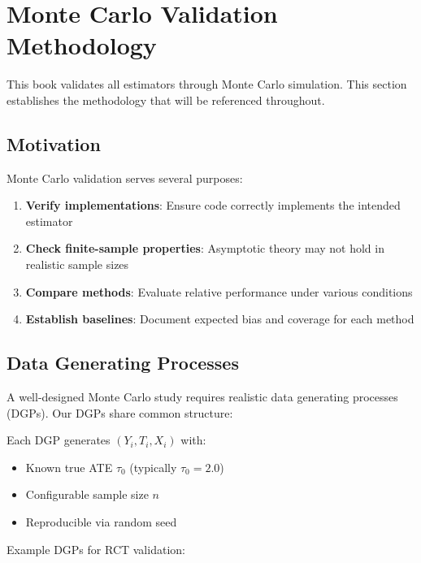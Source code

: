 \section{Monte Carlo Validation Methodology}
\label{sec:mc_methodology}

This book validates all estimators through Monte Carlo simulation. This section establishes the methodology that will be referenced throughout.

\subsection{Motivation}

Monte Carlo validation serves several purposes:
\begin{enumerate}
    \item \textbf{Verify implementations}: Ensure code correctly implements the intended estimator
    \item \textbf{Check finite-sample properties}: Asymptotic theory may not hold in realistic sample sizes
    \item \textbf{Compare methods}: Evaluate relative performance under various conditions
    \item \textbf{Establish baselines}: Document expected bias and coverage for each method
\end{enumerate}

\subsection{Data Generating Processes}

A well-designed Monte Carlo study requires realistic data generating processes (DGPs). Our DGPs share common structure:

\begin{definition}
\label{def:dgp}
Each DGP generates $(Y_i, T_i, X_i)$ with:
\begin{itemize}
    \item Known true ATE $\tau_0$ (typically $\tau_0 = 2.0$)
    \item Configurable sample size $n$
    \item Reproducible via random seed
\end{itemize}
\end{definition}

Example DGPs for RCT validation:

